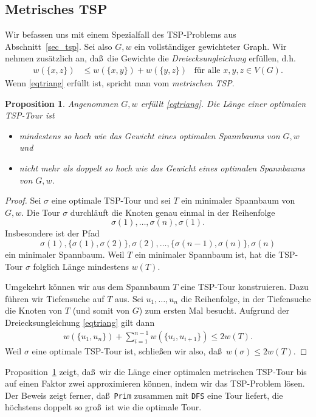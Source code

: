 \documentclass[10pt,reqno]{amsart}
\numberwithin{equation}{section}
\newtheorem{proposition}[definition]{Proposition}
\newcommand\Prop{Proposition}
\begin{document}
\subsection{Metrisches TSP}\label{sec_metric_tsp}
Wir befassen uns mit einem Spezialfall des TSP-Problems aus Abschnitt~\ref{sec_tsp}.
Sei also $G,w$ ein vollst\"andiger gewichteter Graph.
Wir nehmen zus\"atzlich an, da\ss\ die Gewichte die {\em Dreiecksungleichung} erf\"ullen, d.h.\
\begin{align}\label{eqtriang}
	w(\{x,z\})&\leq w(\{x,y\})+w(\{y,z\})&\mbox{f\"ur alle }x,y,z\in V(G).
\end{align}
Wenn \eqref{eqtriang} erf\"ullt ist, spricht man vom {\em metrischen TSP}.

\begin{proposition}\label{prop_metric_tsp}
	Angenommen $G,w$ erf\"ullt \eqref{eqtriang}.
	Die L\"ange einer optimalen TSP-Tour ist
	\begin{itemize}
		\item mindestens so hoch wie das Gewicht eines optimalen Spannbaums von $G,w$ und
		\item nicht mehr als doppelt so hoch wie das Gewicht eines optimalen Spannbaums von $G,w$.
	\end{itemize}
\end{proposition}
\begin{proof}
	Sei $\sigma$ eine optimale TSP-Tour und sei $T$ ein minimaler Spannbaum von $G,w$.
	Die Tour $\sigma$ durchl\"auft die Knoten genau einmal in der Reihenfolge
		$$\sigma(1),\ldots,\sigma(n),\sigma(1).$$
	Insbesondere ist der Pfad
		$$\sigma(1),\{\sigma(1),\sigma(2)\},\sigma(2),\ldots,\{\sigma(n-1),\sigma(n)\},\sigma(n)$$
	ein minimaler Spannbaum.
	Weil $T$ ein minimaler Spannbaum ist, hat die TSP-Tour $\sigma$ folglich L\"ange mindestens $w(T)$.

	Umgekehrt k\"onnen wir aus dem Spannbaum $T$ eine TSP-Tour konstruieren.
	Dazu f\"uhren wir Tiefensuche auf $T$ aus.
	Sei $u_1,\ldots,u_n$ die Reihenfolge, in der Tiefensuche die Knoten von $T$ (und somit von $G$) zum ersten Mal besucht.
	Aufgrund der Dreiecksungleichung \eqref{eqtriang} gilt dann
	\begin{align*}
		w(\{u_1,u_n\})+\sum_{i=1}^{n-1}w(\{u_i,u_{i+1}\})\leq 2w(T).
	\end{align*}
	Weil $\sigma$ eine optimale TSP-Tour ist, schlie\ss en wir also, da\ss\ $w(\sigma)\leq2 w(T)$.
\end{proof}

\Prop~\ref{prop_metric_tsp} zeigt, da\ss\ wir die L\"ange einer optimalen metrischen TSP-Tour bis auf einen Faktor zwei approximieren k\"onnen, indem wir das TSP-Problem l\"osen.
Der Beweis zeigt ferner, da\ss\ {\tt Prim} zusammen mit {\tt DFS} eine Tour liefert, die h\"ochstens doppelt so gro\ss\ ist wie die optimale Tour.
\end{document}
